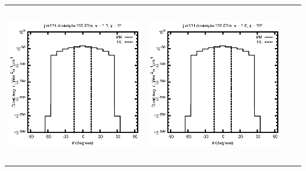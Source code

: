 \begin{tabular}{c c c c}
\includegraphics[height=7cm]{../eps/jok10_Ld_sample_100.00m_fwd.eps} &
\includegraphics[height=7cm]{../eps/jok10_Ld_sample_100.00m_cross.eps} \\
\end{tabular}

\pagebreak

